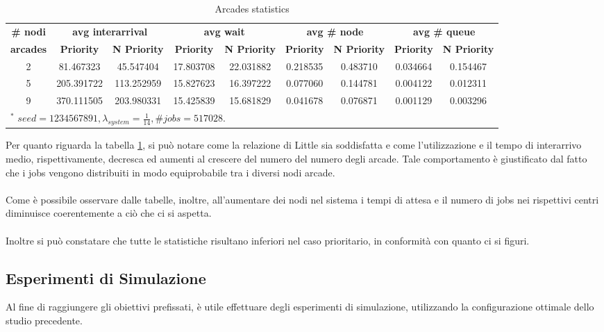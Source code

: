 \documentclass{article}
\begin{document}
\begin{table}[H]
\caption{Arcades statistics}
\begin{center}
\begin{tabular}{|c|c|c|c|c|c|c|c|c|}
\hline
\textbf{\# nodi} & \multicolumn{2}{|c|}{\textbf{avg interarrival}} & \multicolumn{2}{|c|}{\textbf{avg wait}} & \multicolumn{2}{|c|}{\textbf{avg \# node}} & \multicolumn{2}{|c|}{\textbf{avg \# queue}} \\ \cline{2-9} 
\textbf{arcades} & \textbf{Priority} & \textbf{N Priority} & \textbf{Priority} & \textbf{N Priority} & \textbf{Priority} & \textbf{N Priority}& \textbf{Priority} & \textbf{N Priority}\\ \hline
2 & 81.467323 & 45.547404 & 17.803708 & 22.031882 & 0.218535 & 0.483710 & 0.034664 & 0.154467\\ \hline
5 & 205.391722 & 113.252959 & 15.827623 & 16.397222 & 0.077060 & 0.144781 & 0.004122 & 0.012311\\ \hline
9 & 370.111505 & 203.980331 & 15.425839 & 15.681829 & 0.041678 & 0.076871 & 0.001129 & 0.003296\\ \hline
\multicolumn{9}{l}{$^{\mathrm{*}}$ $seed=1234567891, \lambda_{system} =\frac{1}{14} , \# jobs=517028 $.}
\end{tabular}
\label{tab2}
\end{center}
\end{table}


Per quanto riguarda la tabella \ref{tab2}, si può notare come la relazione di Little sia soddisfatta e come l'utilizzazione e il tempo di interarrivo medio, rispettivamente, decresca ed aumenti al crescere del numero del numero degli arcade. Tale comportamento è giustificato dal fatto che i jobs vengono distribuiti in modo equiprobabile tra i diversi nodi arcade.
\\ \\
Come è possibile osservare dalle tabelle, inoltre, all'aumentare dei nodi nel sistema i tempi di attesa e il numero di jobs nei rispettivi centri diminuisce coerentemente a ciò che ci si aspetta.
\\ \\
Inoltre si può constatare che tutte le statistiche risultano inferiori nel caso prioritario, in conformità con quanto ci si figuri.

\subsection{Esperimenti di Simulazione}
Al fine di raggiungere gli obiettivi prefissati, è utile effettuare degli esperimenti di simulazione, utilizzando la configurazione ottimale dello studio precedente.
\end{document}
